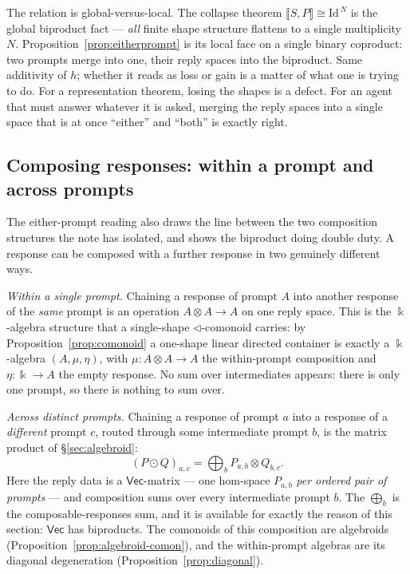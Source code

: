 \documentclass[11pt]{amsart}
\theoremstyle{plain}
\theoremstyle{definition}
\renewcommand{\Vec}{\mathsf{Vec}}
\newcommand{\Id}{\mathrm{Id}}
\newcommand{\ext}[1]{\llbracket #1 \rrbracket}
\newcommand{\fld}{\Bbbk}
\newcommand{\iso}{\cong}
\begin{document}
The relation is global-versus-local. The collapse theorem
$\ext{S,P}\iso\Id^{\,N}$ is the global biproduct fact --- \emph{all} finite shape
structure flattens to a single multiplicity $N$. Proposition~\ref{prop:eitherprompt}
is its local face on a single binary coproduct: two prompts merge into one, their reply
spaces into the biproduct. Same additivity of $h$; whether it reads as loss or gain is a
matter of what one is trying to do. For a representation theorem, losing the shapes is a
defect. For an agent that must answer whatever it is asked, merging the reply spaces
into a single space that is at once ``either'' and ``both'' is exactly right.

\subsection{Composing responses: within a prompt and across prompts}\label{sec:eitherprompt-compose}

The either-prompt reading also draws the line between the two composition structures the
note has isolated, and shows the biproduct doing double duty. A response can be composed
with a further response in two genuinely different ways.

\emph{Within a single prompt.} Chaining a response of prompt $A$ into another response of
the \emph{same} prompt is an operation $A\otimes A\to A$ on one reply space. This is the
$\fld$-algebra structure that a single-shape $\lhd$-comonoid carries: by
Proposition~\ref{prop:comonoid} a one-shape linear directed container is exactly a
$\fld$-algebra $(A,\mu,\eta)$, with $\mu\colon A\otimes A\to A$ the within-prompt
composition and $\eta\colon\fld\to A$ the empty response. No sum over intermediates
appears: there is only one prompt, so there is nothing to sum over.

\emph{Across distinct prompts.} Chaining a response of prompt $a$ into a response of a
\emph{different} prompt $c$, routed through some intermediate prompt $b$, is the matrix
product of \S\ref{sec:algebroid}:
\[
  (P\odot Q)_{a,c}=\bigoplus_{b} P_{a,b}\otimes Q_{b,c}.
\]
Here the reply data is a $\Vec$-matrix --- one hom-space $P_{a,b}$ \emph{per ordered pair
of prompts} --- and composition sums over every intermediate prompt $b$. The
$\bigoplus_b$ is the composable-responses sum, and it is available for exactly the reason
of this section: $\Vec$ has biproducts. The comonoids of this composition are algebroids
(Proposition~\ref{prop:algebroid-comon}), and the within-prompt algebras are its diagonal
degeneration (Proposition~\ref{prop:diagonal}).
\end{document}
